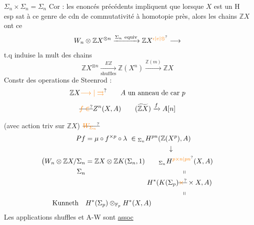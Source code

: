 \(\Sigma_n\times\Sigma_n=\Sigma_n\)
Cor : les enoncés précédents impliquent que lorsque \(X\) est un H esp sat à ce genre de cdn de commutativité à homotopie près, alors les chains \(\mathbb ZX\) ont ce
\[
W_n\otimes\mathbb ZX^{\otimes n}\xrightarrow{\Sigma_n\ \text{equiv}}\mathbb ZX^{\unsure{\epsilon|e|\otimes}}\longrightarrow
\]
t.q induise la mult des chains
\[
\mathbb ZX^{\otimes n}\xrightarrow[\text{shuffles}]{EZ}\mathbb Z(X^n)\xrightarrow{\mathbb Z(m)}\mathbb ZX
\]
Constr des operations de Steenrod :
\[
\mathbb ZX\unsure{\longrightarrow|\rightrightarrows}\qquad A\ \text{un anneau de car}\ p
\]
\[
\deleted{\unsure{f\in}}Z^n(X,A)\qquad(\widetilde{\mathbb ZX})\xrightarrow{f} A[n]
\]

(avec action triv sur \(\mathbb ZX\))
\(\deleted{\unsure{W_{\Sigma_n}}}\)
\[
\begin{aligned}
Pf&=\mu\circ f^{\times p}\circ\lambda\ \in{}_{\Sigma_n}H^{pn}(\mathbb Z(X^p),A)\\
&\hspace{12em}\downarrow\\
\bigl(W_n\otimes\mathbb ZX/\Sigma_n&=\mathbb ZX\otimes\mathbb ZK(\Sigma_n,1)\qquad{}_{\Sigma_n}H^{\unsure{p\times n|pn}}(X,A)\\
\Sigma_n&\hspace{14em}\shortparallel\\
&\hspace{9em}H^*(K(\Sigma_{p})\deleted{\unsure{\times}}\times X,A)\\
&\hspace{14em}\shortparallel\\
\text{Kunneth}\quad &H^*(\Sigma_p)\otimes_{\mathbb F_p}H^*(X,A)
\end{aligned}
\]
Les applications shuffles et A-W sont \uline{assoc}

